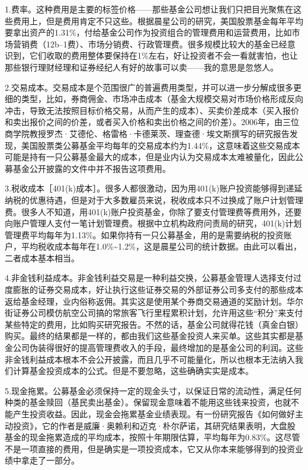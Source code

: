 1.费率。这种费用是主要的标签价格——那些基金公司想让我们只把目光聚焦在这些费用上，但是费用肯定不只这些。根据晨星公司的研究，美国股票基金每年平均要拿出资产的1.31\%，付给基金公司作为投资组合的管理费用和运营费用，比如市场营销费（12b–1费）、市场分销费、行政管理费。很多规模比较大的基金已经意识到，它们收取的费用整体要保持在1\%左右，好让投资者不会一看就害怕，也让那些银行理财经理和证券经纪人有好的故事可以卖——我的意思是忽悠人。

2.交易成本。交易成本是个范围很广的普遍费用类型，并可以进一步分解成很多更细的类型，比如，券商佣金、市场冲击成本（基金大规模交易对市场价格形成反向冲击，导致无法按照目标价格交易，从而产生的成本）、买卖价差成本（买入报价和卖出报价之间的价差，或者买入价格和卖出价格之间的价差）。2006年，由三位商学院教授罗杰·艾德伦、格雷格·卡德莱茨、理查德·埃文斯撰写的研究报告发现，美国股票类公募基金平均每年的交易成本约为1.44\%，这意味着这些交易成本可能是持有一只公募基金最大的成本，但是业内认为交易成本太难被量化，因此公募基金公开披露的文件中并不报告这项费用。

3.税收成本［401(k)成本］。很多人都很激动，因为用401(k)账户投资能够得到递延纳税的优惠待遇，但是对于大多数雇员来说，税收成本只不过换成了账户计划管理费。很多人不知道，用401(k)账户投资基金，你除了要支付管理费等费用外，还要向账户管理人支付一笔计划管理费。根据中立机构政府问责局的研究，401(k)计划管理费平均每年为1.13\%。如果你持有一只公募基金，用的是需要纳税的投资账户，平均税收成本每年在1.0\%\textasciitilde{}1.2\%，这是晨星公司的统计数据。由此可以看出，二者成本基本相当。

4.非金钱利益成本。非金钱利益交易是一种利益交换，公募基金管理人选择支付过度膨胀的证券交易成本，好让执行这些证券交易的外部证券公司多支付的那些成本返给基金经理，业内俗称返佣。其实这是使用某个券商交易通道的奖励计划。华尔街证券公司模仿航空公司搞的常旅客飞行里程累积计划，允许用这些“积分”来支付某些特定的费用，比如购买研究报告。不然的话，基金公司就得花钱（真金白银）购买。最终的结果都是一样的，都由我们这些基金投资人来买单。这些其实都是基金公司伪装得很好的提高管理费收入的手段，最终增加的是基金公司的利润。这些非金钱利益成本根本不会公开披露，而且几乎不可能量化，所以也根本无法纳入我们计算基金投资成本的公式。但是不要忽略，这些确确实实是成本。

5.现金拖累。公募基金必须保持一定的现金头寸，以保证日常的流动性，满足任何种类的基金赎回（基民卖出基金）。保留现金意味着不能用这些钱来投资，也就不能产生投资收益。因此，现金会拖累基金业绩表现。有一份研究报告《如何做好主动投资》，它的作者是威廉·奥赖利和迈克·朴尔萨诺，其研究结果表明，大盘股基金的现金拖累造成的平均成本，按照十年期限估算，平均每年为0.83\%。这尽管不是一项直接的费用，但是确实是一项投资成本，它又从你本来能够得到的投资业绩中拿走了一部分。

